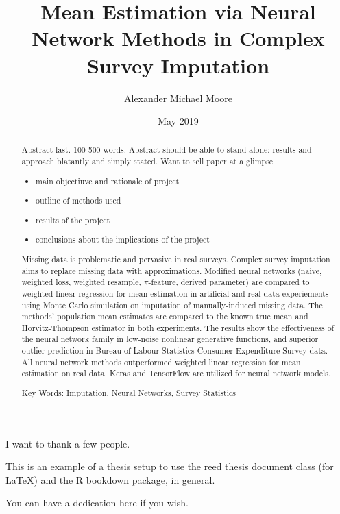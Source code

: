\documentclass[12pt,twoside]{reedthesis}
\title{Mean Estimation via Neural Network Methods in Complex Survey Imputation}
\author{Alexander Michael Moore}
\date{May 2019}
\providecommand{\tightlist}{%
  \setlength{\itemsep}{0pt}\setlength{\parskip}{0pt}}
\begin{document}
  \maketitle

\frontmatter %
\pagestyle{empty} %
  \begin{acknowledgements}
    I want to thank a few people.
  \end{acknowledgements}
  \begin{preface}
    This is an example of a thesis setup to use the reed thesis document
    class (for LaTeX) and the R bookdown package, in general.
  \end{preface}
  \hypersetup{linkcolor=black}
  \setcounter{tocdepth}{2}
  \tableofcontents

  \listoftables

  \listoffigures
  \begin{abstract}
    Abstract last. 100-500 words. Abstract should be able to stand alone:
    results and approach blatantly and simply stated. Want to sell paper at
    a glimpse
    \begin{itemize}
    \tightlist
    \item
      main objectiuve and rationale of project
    \item
      outline of methods used
    \item
      results of the project
    \item
      conclusions about the implications of the project
    \end{itemize}
    Missing data is problematic and pervasive in real surveys. Complex
    survey imputation aims to replace missing data with approximations.
    Modified neural networks (naive, weighted loss, weighted resample,
    \(\pi\)-feature, derived parameter) are compared to weighted linear
    regression for mean estimation in artificial and real data experiements
    using Monte Carlo simulation on imputation of manually-induced missing
    data. The methods' population mean estimates are compared to the known
    true mean and Horvitz-Thompson estimator in both experiments. The
    results show the effectiveness of the neural network family in low-noise
    nonlinear generative functions, and superior outlier prediction in
    Bureau of Labour Statistics Consumer Expenditure Survey data. All neural
    network methods outperformed weighted linear regression for mean
    estimation on real data. Keras and TensorFlow are utilized for neural
    network models.
    
    Key Words: Imputation, Neural Networks, Survey Statistics
  \end{abstract}
  \begin{dedication}
    You can have a dedication here if you wish.
  \end{dedication}
\mainmatter %
\pagestyle{fancyplain} %
\end{document}
